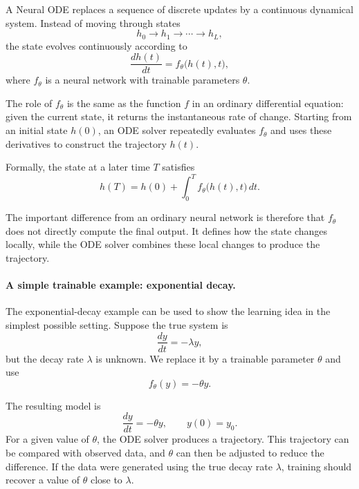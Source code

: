 \documentclass[11pt,a4paper]{article}
\begin{document}
A Neural ODE replaces a sequence of discrete updates by a continuous
dynamical system. Instead of moving through states
\[
    h_0 \to h_1 \to \cdots \to h_L,
\]
the state evolves continuously according to
\begin{equation}
    \frac{dh(t)}{dt}
    =
    f_\theta\bigl(h(t),t\bigr),
    \label{eq:node}
\end{equation}
where $f_\theta$ is a neural network with trainable parameters $\theta$.

The role of $f_\theta$ is the same as the function $f$ in an ordinary
differential equation: given the current state, it returns the instantaneous
rate of change. Starting from an initial state $h(0)$, an ODE solver repeatedly
evaluates $f_\theta$ and uses these derivatives to construct the trajectory
$h(t)$.

Formally, the state at a later time $T$ satisfies
\begin{equation}
    h(T)
    =
    h(0)
    +
    \int_0^T
    f_\theta\bigl(h(t),t\bigr)\,dt .
    \label{eq:odesolve}
\end{equation}

The important difference from an ordinary neural network is therefore that
$f_\theta$ does not directly compute the final output. It defines how the
state changes locally, while the ODE solver combines these local changes to
produce the trajectory.

\paragraph{A simple trainable example: exponential decay.}

The exponential-decay example can be used to show the learning idea in the
simplest possible setting. Suppose the true system is
\[
    \frac{dy}{dt}=-\lambda y,
\]
but the decay rate $\lambda$ is unknown. We replace it by a trainable
parameter $\theta$ and use
\begin{equation}
    f_\theta(y)=-\theta y.
    \label{eq:toy-field}
\end{equation}

The resulting model is
\[
    \frac{dy}{dt}=-\theta y,
    \qquad
    y(0)=y_0.
\]
For a given value of $\theta$, the ODE solver produces a trajectory. This
trajectory can be compared with observed data, and $\theta$ can then be
adjusted to reduce the difference. If the data were generated using the true
decay rate $\lambda$, training should recover a value of $\theta$ close to
$\lambda$.
\end{document}
